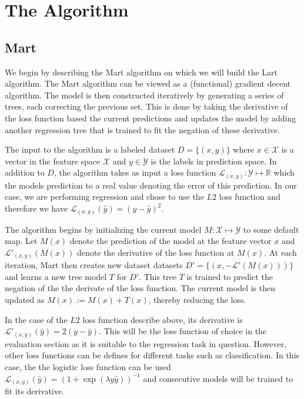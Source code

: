 \documentclass{article} %
\begin{document}
\section{The Algorithm} \label{sec:algo}

\subsection{Mart}
We begin by describing the Mart\cite{mart} algorithm on which we will build the Lart algorithm. The Mart algorithm can be viewed as a (functional) gradient decent algorithm. The model is then constructed iteratively by generating a series of trees, each correcting the previous set. This is done by taking the derivative of the loss function based the current predictions and updates the model by adding another regression tree that is trained to fit the negation of these derivative. 

The input to the algorithm is a labeled dataset $D=\{(x,y)\}$ where $x\in \mathcal{X}$ is a vector in the feature space $\mathcal{X}$ and $y\in \mathcal{Y}$ is the labels in prediction space. In addition to $D$, the algorithm takes as input a loss function $\mathcal{L}_{(x,y)} :  \mathcal{Y} \mapsto \mathds{R} $ which the models prediction to a real value denoting the error of this prediction. In our case, we are performing regression and chose to use the $L2$ loss function and therefore we have $\mathcal{L}_{(x,y)}(\hat{y} ) = (y- \hat{y})^2$.
 
 
The algorithm begins by initializing the current model $M:\mathcal{X}\mapsto \mathcal{Y}$ to some default map. Let $M(x)$ denote the prediction of the model at the feature vector $x$ and $\mathcal{L}'_{(x,y)}(M(x))$ denote the derivative of the loss function at $M(x)$. At each iteration, Mart then creates new dataset datasets $D'=\{(x,-\mathcal{L}'(M(x)))\}$  and learns a new tree model $T$ for $D'$. This tree $T$ is trained to predict the negation of the the derivate of the loss function. The current model is then updated as $M(x):= M(x) + T(x)$, thereby reducing the loss.

In the case of the $L2$ loss function describe above, its derivative is $\mathcal{L}'_{(x,y)}(\hat{y}) = 2(y - \hat{y})$. This will be the loss function of choice in the evaluation section as it is suitable to the regression task in question. However, other loss functions can be defines for different tasks such as classification. In this case, the  the logistic loss function can be used $\mathcal{L}_{(x,y)} (\hat{y}) =( 1 + \exp(\lambda y \hat{y}))^{-1}$ and consecutive models will be trained to fit its derivative.
\end{document}
